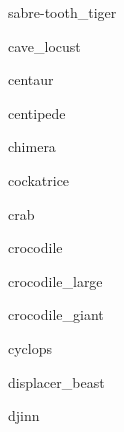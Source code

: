 \documentclass[letterpaper,serif]{module}
\begin{document}
\begin{newmonster}{sabre-tooth_tiger}\end{newmonster}

\begin{newmonster}{cave_locust}\end{newmonster}

\begin{newmonster}{centaur}\end{newmonster}

\begin{newmonster}{centipede}\end{newmonster}

\begin{newmonster}{chimera}\end{newmonster}

\begin{newmonster}{cockatrice}\end{newmonster}

\begin{newmonster}{crab}\end{newmonster}

\begin{newmonster}{crocodile}\end{newmonster}

\begin{newmonster}{crocodile_large}\end{newmonster}

\begin{newmonster}{crocodile_giant}\end{newmonster}

\begin{newmonster}{cyclops}\end{newmonster}

\begin{newmonster}{displacer_beast}\end{newmonster}

\begin{newmonster}{djinn}\end{newmonster}
\end{document}
